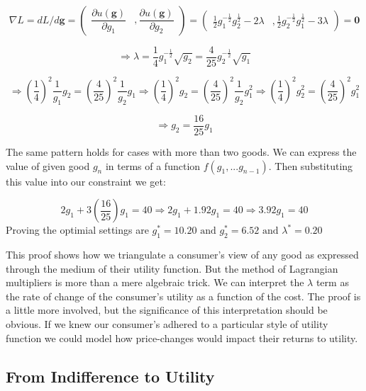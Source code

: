 \documentclass{tufte-handout}
\begin{document}
\begin{fullwidth}
\begin{example}

\[
\nabla L = dL /  d\mathbf{g} =
    \begin{pmatrix}
       \dfrac{\partial u(\mathbf{g})}{\partial g_1}   & , \dfrac{\partial u(\mathbf{g})}{\partial g_2}
    \end{pmatrix} = \begin{pmatrix}
    \frac{1}{2}g_{1}^{-\frac{1}{2}}g_{2}^{\frac{1}{2} } - 2\lambda & ,
    \frac{1}{2}g_{2}^{-\frac{1}{2}}g_{1}^{\frac{1}{2} } - 3\lambda
    \end{pmatrix} = \mathbf{0}
  \]


$$ \Rightarrow \lambda = \frac{1}{4}g_{1}^{-\frac{1}{2}}\sqrt{g_{2}} = \frac{4}{25}g_{2}^{-\frac{1}{2}}\sqrt{g_{1}}$$

$$ \Rightarrow  (\frac{1}{4})^2\frac{1}{g_{1}}g_{2} = (\frac{4}{25})^2\frac{1}{g_{2}}g_{1} \Rightarrow (\frac{1}{4})^2 g_{2} = (\frac{4}{25})^2\frac{1}{g_{2}}g_{1}^2  \Rightarrow (\frac{1}{4})^2g_{2}^{2} = (\frac{4}{25})^2g_{1}^2 $$ 

$$ \Rightarrow g_{2} = \frac{16}{25}g_{1}$$

\noindent The same pattern holds for cases with more than two goods. We can express the value of given good $g_n$ in terms of a function $f(g_{1}, ... g_{n-1}) $. Then substituting this value into our constraint we get: 

$$ 2g_{1} + 3(\frac{16}{25})g_{1} = 40 \Rightarrow 2g_{1} + 1.92g_{1} = 40 \Rightarrow 3.92g_{1} = 40$$
Proving the optimial settings are  $g_{1}^{*} = 10.20 \text{ and } g_{2}^{*} = 6.52 \text{ and } \lambda^{*} = 0.20 $

\end{example}
\end{fullwidth}

This proof shows how we triangulate a consumer's view of any good as expressed through the medium of their utility function. But the method of Lagrangian multipliers is more than a mere algebraic trick. We can interpret the $\lambda$ term as the rate of change of the consumer's utility as a function of the cost. The proof is a little more involved, but the significance of this interpretation should be obvious. If we knew our consumer's adhered to a particular style of utility function we could model how price-changes would impact their returns to utility. 

\subsection*{From Indifference to Utility}
\end{document}
